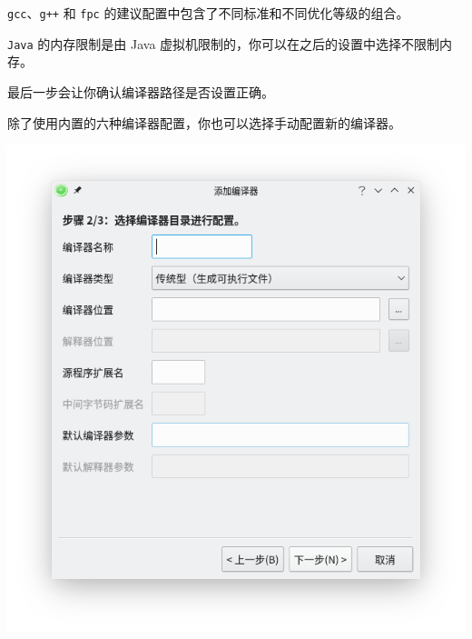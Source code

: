 \documentclass[UTF-8]{ctexart}
\begin{document}
				\texttt{gcc}、\texttt{g++} 和 \texttt{fpc} 的建议配置中包含了不同标准和不同优化等级的组合。

				\texttt{Java} 的内存限制是由 Java 虚拟机限制的，你可以在之后的设置中选择不限制内存。

				最后一步会让你确认编译器路径是否设置正确。

				除了使用内置的六种编译器配置，你也可以选择手动配置新的编译器。

				\begin{center}
					\includegraphics[scale=0.7]{pics/addcompiler2.png}
				\end{center}
\end{document}
